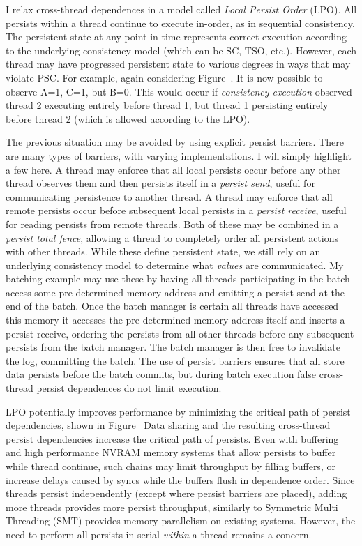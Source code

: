 I relax cross-thread dependences in a model called \emph{Local Persist Order} (LPO).
All persists within a thread continue to execute in-order, as in sequential consistency.
The persistent state at any point in time represents correct execution according to the underlying consistency model (which can be SC, TSO, etc.).
However, each thread may have progressed persistent state to various degrees in ways that may violate PSC.
For example, again considering Figure~.
It is now possible to observe A=1, C=1, but B=0.
This would occur if \emph{consistency execution} observed thread 2 executing entirely before thread 1, but thread 1 persisting entirely before thread 2 (which is allowed according to the LPO).

The previous situation may be avoided by using explicit persist barriers.
There are many types of barriers, with varying implementations.
I will simply highlight a few here.
A thread may enforce that all local persists occur before any other thread observes them and then persists itself in a \emph{persist send}, useful for communicating persistence to another thread.
A thread may enforce that all remote persists occur before subsequent local persists in a \emph{persist receive}, useful for reading persists from remote threads.
Both of these may be combined in a \emph{persist total fence}, allowing a thread to completely order all persistent actions with other threads.
While these define persistent state, we still rely on an underlying consistency model to determine what \emph{values} are communicated.
My batching example may use these by having all threads participating in the batch access some pre-determined memory address and emitting a persist send at the end of the batch.
Once the batch manager is certain all threads have accessed this memory it accesses the pre-determined memory address itself and inserts a persist receive, ordering the persists from all other threads before any subsequent persists from the batch manager.
The batch manager is then free to invalidate the log, committing the batch.
The use of persist barriers ensures that all store data persists before the batch commits, but during batch execution false cross-thread persist dependences do not limit execution.


LPO potentially improves performance by minimizing the critical path of persist dependencies, shown in Figure~
Data sharing and the resulting cross-thread persist dependencies increase the critical path of persists.
Even with buffering and high performance NVRAM memory systems that allow persists to buffer while thread continue, such chains may limit throughput by filling buffers, or increase delays caused by syncs while the buffers flush in dependence order.
Since threads persist independently (except where persist barriers are placed), adding more threads provides more persist throughput, similarly to Symmetric Multi Threading (SMT) provides memory parallelism on existing systems.
However, the need to perform all persists in serial \emph{within} a thread remains a concern.

